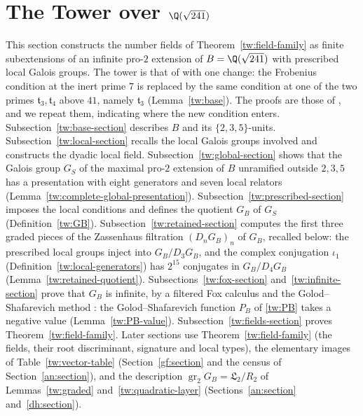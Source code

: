\section{\texorpdfstring{The Tower over $\Q(\sqrt{241})$}{The Tower over Q(sqrt 241)}}\label{tw:tower}

This section constructs the number fields of Theorem~\ref{tw:field-family}
as finite subextensions of an infinite pro-$2$ extension of $B=\Q(\sqrt{241})$
with prescribed local Galois groups. The tower is that of
\cite[Section~2]{Naslund04273} with one change: the Frobenius condition at
the inert prime $7$ is replaced by the same condition at one of the two
primes $\mathfrak t_3,\mathfrak t_4$ above $41$, namely $\mathfrak t_3$
(Lemma~\ref{tw:base}). The proofs are those of \cite{Naslund04273}, and we
repeat them, indicating where the new condition enters. Subsection~\ref{tw:base-section} describes $B$ and its
$\{2,3,5\}$-units. Subsection~\ref{tw:local-section} recalls the local Galois
groups involved and constructs the dyadic local field.
Subsection~\ref{tw:global-section} shows that the Galois group
$G_S$ of the maximal pro-$2$ extension of $B$ unramified outside
$2,3,5$ has a presentation with eight generators and seven local relators
(Lemma~\ref{tw:complete-global-presentation}).
Subsection~\ref{tw:prescribed-section} imposes the local conditions and
defines the quotient $G_B$ of $G_S$ (Definition~\ref{tw:GB}).
Subsection~\ref{tw:retained-section} computes the first three graded pieces
of the Zassenhaus filtration $(D_nG_B)_n$ of $G_B$, recalled below: the
prescribed local groups inject into $G_B/D_3G_B$, and the complex
conjugation $\iota_1$ (Definition~\ref{tw:local-generators}) has $2^{15}$
conjugates in $G_B/D_4G_B$ (Lemma~\ref{tw:retained-quotient}).
Subsections~\ref{tw:fox-section} and~\ref{tw:infinite-section} prove that
$G_B$ is infinite, by a filtered Fox calculus and the Golod--Shafarevich
method \cite{GolodShafarevich}: the Golod--Shafarevich function $P_B$ of
\eqref{tw:PB} takes a negative value (Lemma~\ref{tw:PB-value}).
Subsection~\ref{tw:fields-section} proves Theorem~\ref{tw:field-family}.
Later sections use Theorem~\ref{tw:field-family} (the fields, their root
discriminant, signature and local types), the elementary images of
Table~\ref{tw:vector-table} (Section~\ref{gf:section} and the census of
Section~\ref{an:section}), and the description
$\operatorname{gr}_2G_B=\mathfrak L_2/R_2$ of Lemmas~\ref{tw:graded}
and~\ref{tw:quadratic-layer} (Sections~\ref{an:section}
and~\ref{dh:section}).

